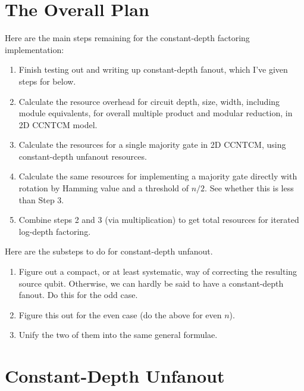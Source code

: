 \documentclass{article}
\begin{document}
\section{The Overall Plan}

Here are the main steps remaining for the constant-depth factoring
implementation:

\begin{enumerate}

\item
Finish testing out and writing up constant-depth fanout, which I've
given steps for below.

\item
Calculate the resource overhead for circuit depth, size, width,
including module equivalents, for overall multiple product and
modular reduction, in 2D CCNTCM model.

\item
Calculate the resources for a single majority gate in 2D CCNTCM,
using constant-depth unfanout resources.

\item
Calculate the same resources for implementing a majority gate
directly with rotation by Hamming value and a threshold of
$n/2$. See whether this is less than Step 3.

\item
Combine steps 2 and 3 (via multiplication) to get total resources
for iterated log-depth factoring.

\end{enumerate}

Here are the substeps to do for constant-depth unfanout.

\begin{enumerate}
\item Figure out a compact, or at least systematic, way of correcting the
resulting source qubit. Otherwise, we can hardly be said to have a
constant-depth fanout. Do this for the odd case.

\item Figure this out for the even case (do the above for even $n$).

\item Unify the two of them into the same general formulae.

\end{enumerate}

\section{Constant-Depth Unfanout}
\end{document}
